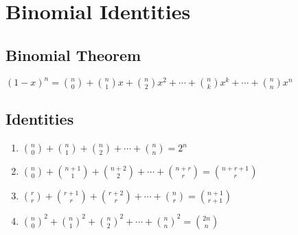 \documentclass{article}
\begin{document}
\section{Binomial Identities}
\subsection{Binomial Theorem}
$(1-x)^n={n \choose 0}+ {n \choose 1}x+{n \choose 2}x^2+\cdots+{n
\choose k}x^k + \cdots + {n \choose n}x^n$

\subsection{Identities}
\begin{enumerate}
\item ${n \choose 0} + {n \choose 1} + {n \choose 2} + \cdots + {n
\choose n} = 2^n$
\item ${n \choose 0} + {n+1 \choose 1} + {n+2 \choose 2} + \cdots + {n+r
\choose r} = {n+r+1 \choose r}$
\item ${r \choose r} + {r+1 \choose r} + {r+2 \choose r} + \cdots + {n
\choose r} = {n+1 \choose r+1}$
\item ${n \choose 0}^2 + {n \choose 1}^2 + {n \choose 2}^2 + \cdots + {n
\choose n}^2 = {2n \choose n}$
\end{enumerate}
\end{document}
